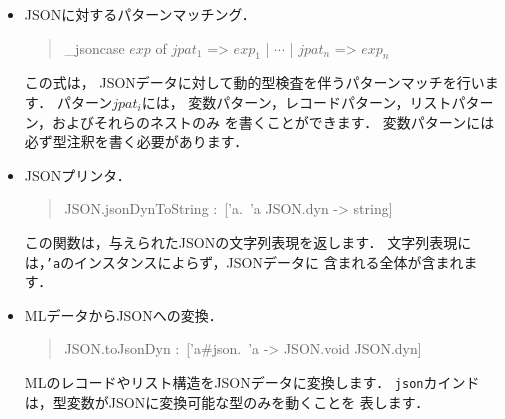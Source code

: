 \documentclass{jbook}
\newenvironment{program}{\begin{quote}\begin{tt}}%
                        {\end{tt}\end{quote}}
\begin{document}
\begin{itemize}
\item
	JSONに対するパターンマッチング．
\begin{program}
\_jsoncase $\mathit{exp}$ of
 $\mathit{jpat_1}$ => $\mathit{exp_1}$
 | $\cdots$ | $\mathit{jpat_n}$ => $\mathit{exp_n}$
\end{program}
	この式は，
JSONデータに対して動的型検査を伴うパターンマッチを行います．
	パターン$\mathit{jpat_i}$には，
変数パターン，レコードパターン，リストパターン，およびそれらのネストのみ
を書くことができます．
	変数パターンには必ず型注釈を書く必要があります．

\item
        JSONプリンタ．
\begin{program}
JSON.jsonDynToString :\ ['a.\ 'a JSON.dyn -> string]
\end{program}
	この関数は，与えられたJSONの文字列表現を返します．
	文字列表現には，{\tt 'a}のインスタンスによらず，JSONデータに
含まれる全体が含まれます．

\item
        MLデータからJSONへの変換．
\begin{program}
JSON.toJsonDyn :\ ['a\#json.\ 'a -> JSON.void JSON.dyn]
\end{program}
	MLのレコードやリスト構造をJSONデータに変換します．
	{\tt json}カインドは，型変数がJSONに変換可能な型のみを動くことを
表します．

\end{itemize}
\end{document}
